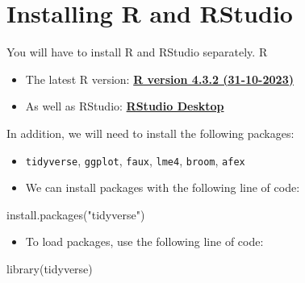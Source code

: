 \documentclass[
  letterpaper,
  DIV=11,
  numbers=noendperiod]{scrreprt}
\newenvironment{Shaded}{\begin{snugshade}}{\end{snugshade}}
\newcommand{\FunctionTok}[1]{\textcolor[rgb]{0.28,0.35,0.67}{#1}}
\newcommand{\NormalTok}[1]{\textcolor[rgb]{0.00,0.23,0.31}{#1}}
\newcommand{\StringTok}[1]{\textcolor[rgb]{0.13,0.47,0.30}{#1}}
\providecommand{\tightlist}{%
  \setlength{\itemsep}{0pt}\setlength{\parskip}{0pt}}\usepackage{longtable,booktabs,array}
\begin{document}

\hypertarget{installing-r-and-rstudio}{%
\chapter{Installing R and RStudio}\label{installing-r-and-rstudio}}

\hfill\break

You will have to install R and RStudio separately. R

\begin{itemize}
\item
  The latest R version: \href{https://cran.rstudio.com/}{\textbf{R
  version 4.3.2 (31-10-2023)}}
\item
  As well as RStudio:
  \href{https://posit.co/download/rstudio-desktop/}{\textbf{RStudio
  Desktop}}
\end{itemize}

In addition, we will need to install the following packages:

\begin{itemize}
\item
  \texttt{tidyverse}, \texttt{ggplot}, \texttt{faux}, \texttt{lme4},
  \texttt{broom}, \texttt{afex}
\item
  We can install packages with the following line of code:
\end{itemize}

\begin{Shaded}
\begin{Highlighting}[]
    \FunctionTok{install.packages}\NormalTok{(}\StringTok{"tidyverse"}\NormalTok{)}
\end{Highlighting}
\end{Shaded}

\begin{itemize}
\tightlist
\item
  To load packages, use the following line of code:
\end{itemize}

\begin{Shaded}
\begin{Highlighting}[]
    \FunctionTok{library}\NormalTok{(tidyverse)}
\end{Highlighting}
\end{Shaded}
\end{document}
